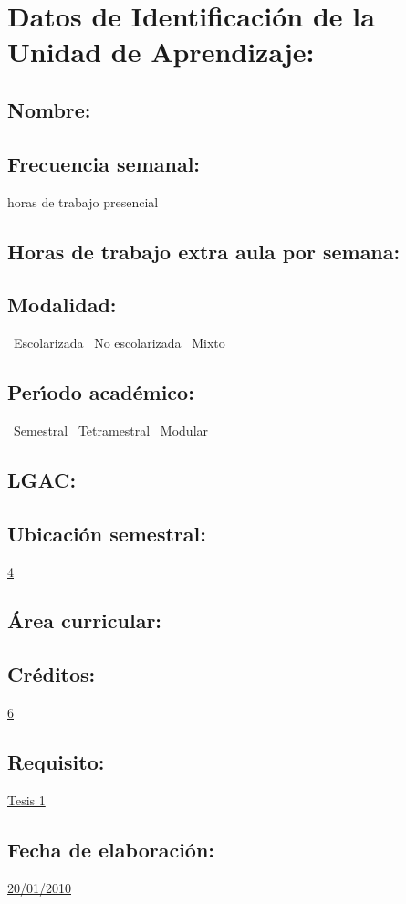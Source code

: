 \documentclass[10 pt]{article}
\begin{document}


\section{Datos de Identificaci\'{o}n de la Unidad de Aprendizaje:}
\subsection{Nombre:} 
\subsection{Frecuencia semanal:} horas de trabajo presencial 
\subsection{Horas de trabajo extra aula por semana:} 
\subsection{Modalidad:} \yes~Escolarizada \no~No escolarizada \no~Mixto
\subsection{Per\'{\i}odo acad\'{e}mico:} \yes~Semestral
\no~Tetramestral \no~Modular
\subsection{LGAC:} \underline{\odsi}
\subsection{Ubicaci\'{o}n semestral:} \underline{4}
\subsection{\'{A}rea curricular:} \underline{\pi}
\subsection{Cr\'{e}ditos:} \underline{6}
\subsection{Requisito:} \underline{Tesis 1}
\subsection{Fecha de elaboraci\'{o}n:} \underline{20/01/2010}
\end{document}
